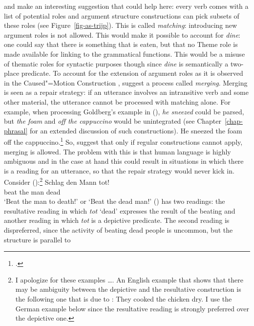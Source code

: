  and \citet{SvT2011a} make an interesting suggestion that could help
here: every verb comes with a list of potential roles and argument structure constructions can pick
subsets of these roles (see Figure~\ref{fig-as-trijp}). This is called \emph{matching}: introducing new argument roles is not allowed. 
This would make it possible to account for \emph{dine}: one could
say that there is something that is eaten, but that no Theme role is made available for linking to
the grammatical functions. This would be a misuse of thematic roles for syntactic purposes though
since \emph{dine} is semantically a two-place predicate. To account for the extension of argument roles as it is observed in the
Caused"=Motion Construction \citep[Chapter~7]{Goldberg95a}, \citet{SvT2011a} suggest a process called \emph{merging}. Merging is seen
as a repair strategy: if an utterance involves an intransitive verb and some other material, the
utterance cannot be processed with matching alone. For example, when processing Goldberg's example
in (), \emph{he sneezed} could be parsed, but \emph{the foam} and \emph{off the cappuccino}
would be unintegrated (see Chapter~\ref{chap-phrasal} for an extended discussion of such constructions).
\ea
He sneezed the foam off the cappuccino.\footnote{%
.
}
\z
So, \citet[--320]{SvT2011a} suggest that only if regular constructions cannot apply, merging is
allowed. The problem with this is that human language is highly ambiguous and in the case
at hand this could result in situations in which there is a reading for an utterance, so that the
repair strategy would never kick in. Consider ():\footnote{%
  I apologize for these examples \ldots. An English example that shows that there may be ambiguity
  between the depictive and the resultative construction is the following one that is due to
  \citet{Haider2016b}:
  \ea
  They cooked the chicken dry.
  \z
  I use the German example below since the resultative reading is strongly preferred over the
  depictive one.
}
\ea
\label{ex-schlag-den-mann-tot}
\gll Schlag den Mann tot!\\
     beat   the man  dead\\
\glt `Beat the man to death!' or `Beat the dead man!'
\z
() has two readings: the resultative reading in which \emph{tot} `dead' expresses the result of the
beating and another reading in which \emph{tot} is a depictive predicate. The second reading is
dispreferred, since the activity of beating dead people is uncommon, but the structure is parallel to
